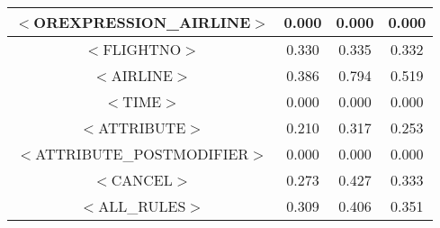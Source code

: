 \documentclass[a4paper,10pt]{article}
\begin{document}
\begin{center}
\begin{tabular}{|c||c|c|c|}
\hline$<$OREXPRESSION\_AIRLINE$>$&0.000&0.000&0.000 \\
\hline$<$FLIGHTNO$>$&0.330&0.335&0.332 \\
\hline$<$AIRLINE$>$&0.386&0.794&0.519 \\
\hline$<$TIME$>$&0.000&0.000&0.000 \\
\hline$<$ATTRIBUTE$>$&0.210&0.317&0.253 \\
\hline$<$ATTRIBUTE\_POSTMODIFIER$>$&0.000&0.000&0.000 \\
\hline$<$CANCEL$>$&0.273&0.427&0.333 \\
\hline
\hline
$<$ALL\_RULES$>$&0.309&0.406&0.351 \\
\hline
\end{tabular}
\end{center}
 \label{tab:title} 
\end{document}
